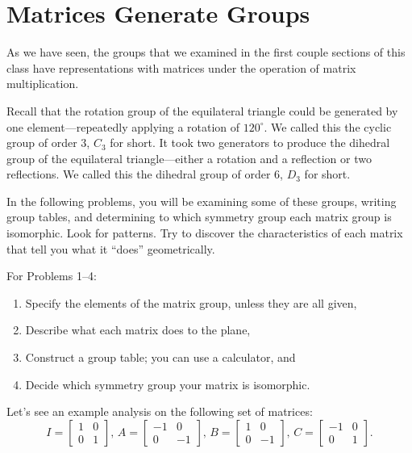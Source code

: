 \documentclass[../gatm.tex]{subfiles}
\begin{document}
\section{Matrices Generate Groups}
\setcounter{problem_i}{0}

As we have seen, the groups that we examined in the first couple sections of this class have representations with matrices under the operation of matrix multiplication.

Recall that the rotation group of the equilateral triangle could be generated by one element---repeatedly applying a rotation of $120^\circ$. We called this the cyclic group of order $3$, $C_3$ for short. It took two generators to produce the dihedral group of the equilateral triangle---either a rotation and a reflection or two reflections. We called this the dihedral group of order $6$, $D_3$ for short.

In the following problems, you will be examining some of these groups, writing group tables, and determining to which symmetry group each matrix group is isomorphic. Look for patterns. Try to discover the characteristics of each matrix that tell you what it ``does'' geometrically.

For Problems 1--4:
\begin{enumerate}[label=(\alph*)]
\item Specify the elements of the matrix group, unless they are all given, %
\item Describe what each matrix does to the plane, %
\item Construct a group table; you can use a calculator, and %
\item Decide which symmetry group your matrix is isomorphic. %
\end{enumerate}

\noindent Let's see an example analysis on the following set of matrices:
$$I=\left[\begin{array}{cc} 1 & 0 \\ 0 & 1 \end{array}\right],\, A=\left[\begin{array}{cc} -1 & 0 \\ 0 & -1 \end{array}\right],\,  B=\left[\begin{array}{cc} 1 & 0 \\ 0 & -1 \end{array}\right],\, C=\left[\begin{array}{cc} -1 & 0 \\ 0 & 1 \end{array}\right].$$
\end{document}
